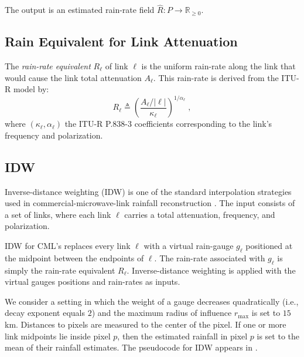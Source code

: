 \documentclass[a4paper,fleqn]{cas-sc}
\begin{document}
The output is an estimated rain-rate field $\hat{R}:P\rightarrow \mathbb{R}_{\geq 0}$.

\subsection{Rain Equivalent for Link Attenuation}\label{sec:rain rate equivalent}
The \emph{rain-rate equivalent} $R_{\ell}$ of link $\ell$ is the uniform rain-rate along the link that would cause the link total attenuation $A_\ell$. This rain-rate is derived from the ITU-R model by:
\[
  R_\ell \triangleq \left(\frac{A_\ell/|\ell|}{\kappa_\ell}\right)^{1/\alpha_\ell}\;,
\]
where $(\kappa_\ell,\alpha_\ell)$ the ITU-R P.838-3 coefficients corresponding to the link's frequency and polarization.

\subsection{IDW}
Inverse-distance weighting (IDW) is one of the standard interpolation strategies used in commercial-microwave-link rainfall reconstruction
\citep{zimmerman1999experimental,jin2003comparison_krigbetter,chen2012estimation_idwforrain,chwala2019cml,eshel2020idw,eshel2021quantitative}.
The input consists of a set of links, where each link $\ell$ carries a total attenuation, frequency, and polarization.

IDW for CML's replaces every link $\ell$ with a virtual rain-gauge $g_{\ell}$ positioned at the midpoint between the endpoints of $\ell$. The rain-rate associated with $g_{\ell}$ is simply the rain-rate equivalent $R_{\ell}$. Inverse-distance weighting is applied with the virtual gauges positions and rain-rates as inputs.

We consider a setting in which the weight of a gauge decreases quadratically (i.e., decay exponent equals $2$) and the maximum radius of influence $r_{\max}$ is set to $15$ \si{\kilo\meter}. Distances to pixels are measured to the center of the pixel.
If one or more link midpoints lie inside pixel $p$, then the estimated rainfall in pixel $p$ is set to the mean of their rainfall estimates. The pseudocode for IDW appears in .
\end{document}
